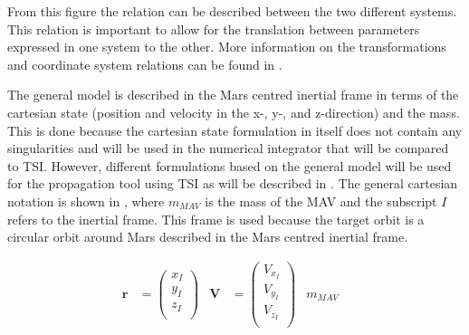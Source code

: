 \noindent
From this figure the relation can be described between the two different systems. This relation is important to allow for the translation between parameters expressed in one system to the other. More information on the transformations and coordinate system relations can be found in .
%
%


The general model is described in the Mars centred inertial frame in terms of the cartesian state (position and velocity in the x-, y-, and z-direction) and the mass. This is done because the cartesian state formulation in itself does not contain any singularities and will be used in the numerical integrator that will be compared to \ac{TSI}. However, different formulations based on the general model will be used for the propagation tool using \ac{TSI} as will be described in . The general cartesian notation is shown in , where $m_{MAV}$ is the mass of the \ac{MAV} and the subscript $I$ refers to the inertial frame. This frame is used because the target orbit is a circular orbit around Mars described in the Mars centred inertial frame.

\begin{align} \label{eq:stateModel}
\mathbf{r}&=\begin{pmatrix}
x_{I}\\
y_{I}\\
z_{I}\\
\end{pmatrix}
&
\mathbf{V}&=\begin{pmatrix}
V_{x_{I}} \\
V_{y_{I}} \\
V_{z_{I}}\\
\end{pmatrix}
&
m_{MAV}&
\end{align}

